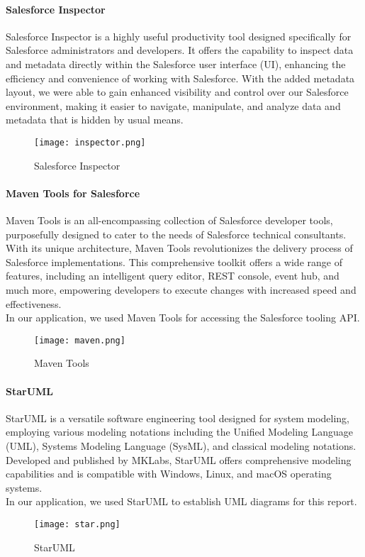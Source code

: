 \paragraph*{Salesforce Inspector}
Salesforce Inspector is a highly useful productivity tool designed specifically for Salesforce administrators and developers. It offers the capability to inspect data and metadata directly within the Salesforce user interface (UI), enhancing the efficiency and convenience of working with Salesforce.
With the added metadata layout, we were able to gain enhanced visibility and control over our Salesforce environment, making it easier to navigate, manipulate, and analyze data and metadata that is hidden by usual means.

\begin{figure}[H]%
    \center   
    \texttt{[image: inspector.png]}
    \caption{Salesforce Inspector}
\end{figure}

\paragraph*{Maven Tools for Salesforce}
Maven Tools is an all-encompassing collection of Salesforce developer tools, purposefully designed to cater to the needs of Salesforce technical consultants. With its unique architecture, Maven Tools revolutionizes the delivery process of Salesforce implementations. This comprehensive toolkit offers a wide range of features, including an intelligent query editor, REST console, event hub, and much more, empowering developers to execute changes with increased speed and effectiveness.\\
In our application, we used Maven Tools for accessing the Salesforce tooling API.

\begin{figure}[H]%
    \center   
    \texttt{[image: maven.png]}
    \caption{Maven Tools}
\end{figure}

\paragraph*{StarUML}
StarUML is a versatile software engineering tool designed for system modeling, employing various modeling notations including the Unified Modeling Language (UML), Systems Modeling Language (SysML), and classical modeling notations. Developed and published by MKLabs, StarUML offers comprehensive modeling capabilities and is compatible with Windows, Linux, and macOS operating systems.\\
In our application, we used StarUML to establish UML diagrams for this report.
\begin{figure}[H]%
    \center   
    \texttt{[image: star.png]}
    \caption{StarUML}
\end{figure}
